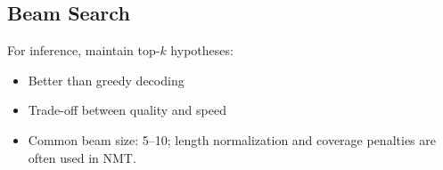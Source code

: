 \subsection{Beam Search}

For inference, maintain top-$k$ hypotheses:
\begin{itemize}
    \item Better than greedy decoding
    \item Trade-off between quality and speed
    \item Common beam size: 5–10; length normalization and coverage penalties are often used in NMT.
\end{itemize}
